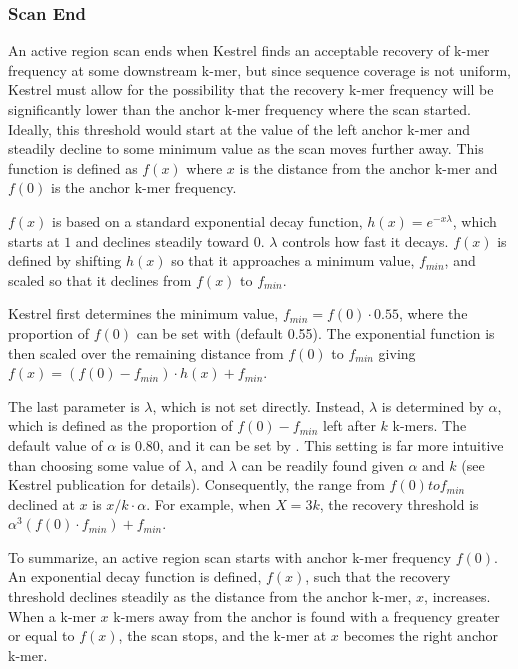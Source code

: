 \subsubsection{Scan End}
\label{sec.process.ardetect.end}

An active region scan ends when Kestrel finds an acceptable recovery of k-mer frequency at some downstream k-mer, but since sequence coverage is not uniform, Kestrel must allow for the possibility that the recovery k-mer frequency will be significantly lower than the anchor k-mer frequency where the scan started. Ideally, this threshold would start at the value of the left anchor k-mer and steadily decline to some minimum value as the scan moves further away. This function is defined as $f(x)$ where $x$ is the distance from the anchor k-mer and $f(0)$ is the anchor k-mer frequency.

$f(x)$ is based on a standard exponential decay function, $h(x) = e^{-x \lambda}$, which starts at $1$ and declines steadily toward $0$. $\lambda$ controls how fast it decays. $f(x)$ is defined by shifting $h(x)$ so that it approaches a minimum value, $f_{min}$, and scaled so that it declines from $f(x)$ to $f_{min}$.

Kestrel first determines the minimum value, $f_{min} = f(0) \cdot 0.55$, where the proportion of $f(0)$ can be set with  (default 0.55). The exponential function is then scaled over the remaining distance from $f(0)$ to $f_{min}$ giving $f(x) = (f(0) - f_{min}) \cdot h(x) + f_{min}$.

The last parameter is $\lambda$, which is not set directly. Instead, $\lambda$ is determined by $\alpha$, which is defined as the proportion of $f(0) - f_{min}$ left after $k$ k-mers. The default value of $\alpha$ is $0.80$, and it can be set by . This setting is far more intuitive than choosing some value of $\lambda$, and $\lambda$ can be readily found given $\alpha$ and $k$ (see Kestrel publication for details). Consequently, the range from $f(0) to f_{min}$ declined at $x$ is $x / k \cdot \alpha$. For example, when $X = 3k$, the recovery threshold is $\alpha^3 (f(0) \cdot f_{min}) + f_{min}$.

To summarize, an active region scan starts with anchor k-mer frequency $f(0)$. An exponential decay function is defined, $f(x)$, such that the recovery threshold declines steadily as the distance from the anchor k-mer, $x$, increases. When a k-mer $x$ k-mers away from the anchor is found with a frequency greater or equal to $f(x)$, the scan stops, and the k-mer at $x$ becomes the right anchor k-mer.

